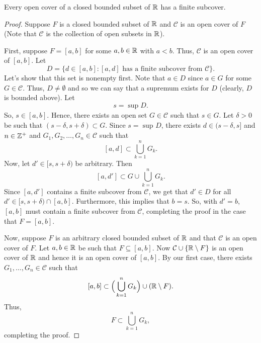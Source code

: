 \documentclass[11pt,a4paper]{book}
\begin{document}
\begin{prop}\label{Heine-Borel Theorem}
   Every open cover of a closed bounded subset of \( \mathbb{R}  \) has a finite subcover. 
\end{prop}
\begin{proof}
    Suppose \( F  \) is a closed bounded subset of \( \mathbb{R}  \) and \( \mathcal{C} \) is an open cover of \( F  \) (Note that \( \mathcal{C}  \) is the collection of open subsets in \( \mathbb{R}  \)). 

    First, suppose \( F = [a,b] \) for some \( a, b \in \mathbb{R}  \) with \( a < b  \). Thus, \( \mathcal{C} \) is an open cover of \( [a,b] \). Let
    \[  D = \{ d \in [a,b] : [a,d] \text{ has a finite subcover from } \mathcal{C}  \}.  \]
    Let's show that this set is nonempty first. Note that \( a \in D  \) since \( a \in G  \) for some \( G \in \mathcal{C} \). Thus, \( D \neq \emptyset  \) and so we can say that a supremum exists for \( D  \) (clearly, \( D \) is bounded above). Let
    \[  s = \sup_{}D. \]
    So, \( s \in [a,b] \). Hence, there exists an open set \( G \in \mathcal{C} \) such that \( s \in G  \). Let \( \delta > 0  \) be such that \( (s- \delta, s + \delta) \subset G  \). Since \( s = \sup_{}D  \), there exists \( d \in (s- \delta, s] \) and \( n \in \mathbb{Z}^{+} \) and \( {G}_{1}, {G}_{2}, \dots, {G}_{n} \in \mathcal{C} \) such that 
    \[  [a,d] \subset \bigcup_{ k=1  }^{ n }  {G}_{k }. \]
    Now, let \( d' \in [s, s+ \delta) \) be arbitrary. Then
    \[  [a,d'] \subset G \cup \bigcup_{ k=1 }^{ n }  {G}_{k}. \]
    Since \( [a,d'] \) contains a finite subcover from \( \mathcal{C} \), we get that \( d' \in D  \) for all \( d' \in [s, s+\delta) \cap [a,b] \). Furthermore, this implies that \(  b = s  \). So, with \( d' = b  \), \( [a,b] \) must contain a finite subcover from \( \mathcal{C} \), completing the proof in the case that \( F = [a,b] \). 

    Now, suppose \( F  \) is an arbitrary closed bounded subset of \( \mathbb{R}  \) and that \( \mathcal{C}  \) is an open cover of \( F  \). Let \( a,b \in \mathbb{R}  \) be such that \( F \subseteq [a,b].  \) Now \( \mathcal{C} \cup \{ \mathbb{R} \setminus F  \}  \) is an open cover of \( \mathbb{R}  \) and hence it is an open cover of \( [a,b] \). By our first case, there exists \( {G}_{1}, \dots, {G}_{n} \in \mathcal{C} \) such that 
    \[  [a,b] \subset \Big( \bigcup_{ k=1  }^{ n }  {G}_{k} \Big) \cup (\mathbb{R} \setminus F).  \]
    Thus, 
    \[  F \subset \bigcup_{ k=1  }^{ n }  {G}_{k}, \]
    completing the proof.
\end{proof}
\end{document}
